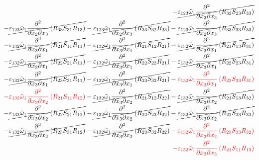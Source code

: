 \begin{equation}
\begin{split}
		-\cancel{\varepsilon_{123}\tilde{\omega}_{1}\pdv{}{x_{2}}{x_{3}}\left(R_{32}S_{23}R_{33}\right)}\\
		-\cancel{\varepsilon_{123}\tilde{\omega}_{1}\pdv{}{x_{2}}{x_{3}}\left(R_{33}S_{31}R_{13}\right)}
		-\cancel{\varepsilon_{123}\tilde{\omega}_{1}\pdv{}{x_{2}}{x_{3}}\left(R_{33}S_{32}R_{23}\right)}
		-\cancel{\varepsilon_{123}\tilde{\omega}_{1}\pdv{}{x_{2}}{x_{3}}\left(R_{33}S_{33}R_{33}\right)}\\
		-\cancel{\varepsilon_{132}\tilde{\omega}_{1}\pdv{}{x_{3}}{x_{1}}\left(R_{21}S_{11}R_{11}\right)}
		-\cancel{\varepsilon_{132}\tilde{\omega}_{1}\pdv{}{x_{3}}{x_{1}}\left(R_{21}S_{12}R_{21}\right)}
		-\cancel{\varepsilon_{132}\tilde{\omega}_{1}\pdv{}{x_{3}}{x_{1}}\left(R_{21}S_{13}R_{31}\right)}\\
		-\cancel{\varepsilon_{132}\tilde{\omega}_{1}\pdv{}{x_{3}}{x_{1}}\left(R_{22}S_{21}R_{11}\right)}
		-\cancel{\varepsilon_{132}\tilde{\omega}_{1}\pdv{}{x_{3}}{x_{1}}\left(R_{22}S_{22}R_{21}\right)}
		-\cancel{\varepsilon_{132}\tilde{\omega}_{1}\pdv{}{x_{3}}{x_{1}}\left(R_{22}S_{23}R_{31}\right)}\\
		-\cancel{\varepsilon_{132}\tilde{\omega}_{1}\pdv{}{x_{3}}{x_{1}}\left(R_{23}S_{31}R_{11}\right)}
		-\cancel{\varepsilon_{132}\tilde{\omega}_{1}\pdv{}{x_{3}}{x_{1}}\left(R_{23}S_{32}R_{21}\right)}
		-{\color{red}\varepsilon_{132}\tilde{\omega}_{1}\pdv{}{x_{3}}{x_{1}}\left(R_{23}S_{33}R_{31}\right)}\\
		-{\color{red}\varepsilon_{132}\tilde{\omega}_{1}\pdv{}{x_{3}}{x_{2}}\left(R_{21}S_{11}R_{12}\right)}
		-\cancel{\varepsilon_{132}\tilde{\omega}_{1}\pdv{}{x_{3}}{x_{2}}\left(R_{21}S_{12}R_{22}\right)}
		-\cancel{\varepsilon_{132}\tilde{\omega}_{1}\pdv{}{x_{3}}{x_{2}}\left(R_{21}S_{13}R_{32}\right)}\\
		-\cancel{\varepsilon_{132}\tilde{\omega}_{1}\pdv{}{x_{3}}{x_{2}}\left(R_{22}S_{21}R_{12}\right)}
		-\cancel{\varepsilon_{132}\tilde{\omega}_{1}\pdv{}{x_{3}}{x_{2}}\left(R_{22}S_{22}R_{22}\right)}
		-\cancel{\varepsilon_{132}\tilde{\omega}_{1}\pdv{}{x_{3}}{x_{2}}\left(R_{22}S_{23}R_{32}\right)}\\
		-\cancel{\varepsilon_{132}\tilde{\omega}_{1}\pdv{}{x_{3}}{x_{2}}\left(R_{23}S_{31}R_{12}\right)}
		-\cancel{\varepsilon_{132}\tilde{\omega}_{1}\pdv{}{x_{3}}{x_{2}}\left(R_{23}S_{32}R_{22}\right)}
		-{\color{red}\varepsilon_{132}\tilde{\omega}_{1}\pdv{}{x_{3}}{x_{2}}\left(R_{23}S_{33}R_{32}\right)}\\
		-{\color{red}\varepsilon_{132}\tilde{\omega}_{1}\pdv{}{x_{3}}{x_{3}}\left(R_{21}S_{11}R_{13}\right)}

\end{split}
\end{equation}
